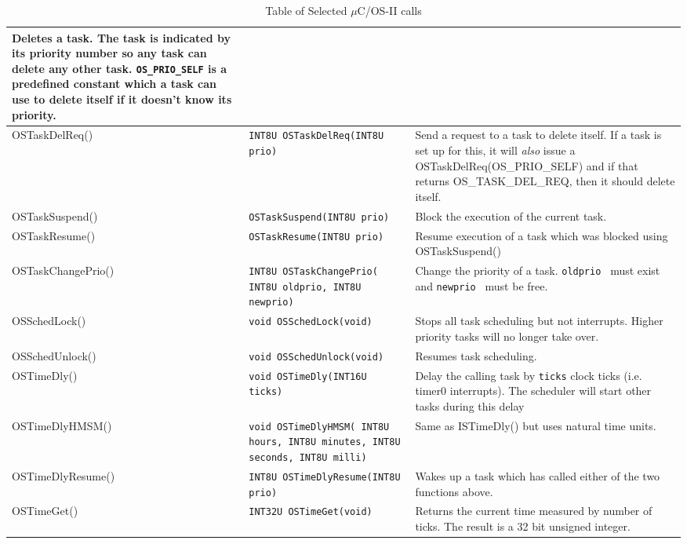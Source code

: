 \documentclass{article}	%
\begin{document}
\begin{table}
\begin{center}
\begin{tabular}{|l|p{1.6in}|p{2.75in} |}
                Deletes a task. The task is indicated by its priority
                number so any task can delete any other task.
                {\tt OS\_PRIO\_SELF} is a predefined constant
                which a task can use to delete itself if it doesn't know
                its priority. \\ \hline
OSTaskDelReq() & {\tt INT8U OSTaskDelReq(INT8U prio) }  &
                Send a request to a task to delete itself.   If a task is
                set up for this, it will {\it also} issue a
                OSTaskDelReq(OS\_PRIO\_SELF) and if that returns
                OS\_TASK\_DEL\_REQ, then it should delete itself.  \\ \hline
OSTaskSuspend() & {\tt OSTaskSuspend(INT8U prio)}       &
                Block the execution of the current task.    \\ \hline
OSTaskResume()  & {\tt OSTaskResume(INT8U prio)}        &
                Resume execution of a task which was blocked using
                OSTaskSuspend()  \\ \hline
OSTaskChangePrio()& {\tt INT8U OSTaskChangePrio( INT8U oldprio, INT8U newprio)} &
                Change the priority of a task.  {\tt oldprio } must exist
                and {\tt newprio } must be free.    \\ \hline
OSSchedLock()   & {\tt void OSSchedLock(void)} &
                Stops all task scheduling but not interrupts.
                Higher priority tasks will no longer take over. \\ \hline
OSSchedUnlock() & {\tt void OSSchedUnlock(void)} &
                Resumes task scheduling. \\ \hline
OSTimeDly()     & {\tt void OSTimeDly(INT16U ticks)} &
                Delay the calling task by {\tt ticks} clock ticks (i.e. timer0
                interrupts).  The scheduler will start other tasks during
                this delay       \\ \hline
OSTimeDlyHMSM() & {\tt void OSTimeDlyHMSM( INT8U hours, INT8U minutes, INT8U seconds, INT8U milli) }    &
                Same as ISTimeDly() but uses natural time units.         \\ \hline
OSTimeDlyResume()       & {\tt INT8U OSTimeDlyResume(INT8U prio) }      &
                Wakes up a task which has called either of the two functions
                above.   \\ \hline
OSTimeGet()     & {\tt INT32U OSTimeGet(void)}  &
                Returns the current time measured by number of ticks.
                The result is a 32 bit unsigned integer.  \\ \hline

\end{tabular}
\caption{Table of Selected $\mu$C/OS-II calls}
\label{Ta:FC0}
\end{center}
\end{table}
\end{document}
